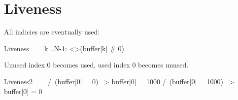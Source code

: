 \section{Liveness}

All indicies are eventually used:

\begin{tla}
    Liveness ==
    \A k ..N-1:
    <>(buffer[k] # 0)
\end{tla}
\begin{tlatex}
%
%
%
\end{tlatex}

Unused index 0 becomes used, used index 0 becomes unused.
\begin{tla}
    Liveness2 ==
    /\ (buffer[0] = 0) ~> buffer[0] = 1000
    /\ (buffer[0] = 1000) ~> buffer[0] = 0
\end{tla}
\begin{tlatex}
%
\end{tlatex}

% 